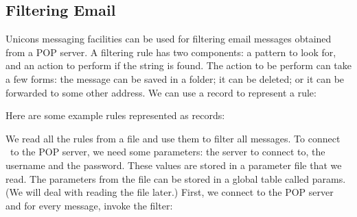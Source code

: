 \subsection{Filtering Email}

Unicon{\textquotesingle}s messaging facilities can be used for filtering
email messages obtained from a POP server. A filtering rule has two
components: a pattern to look for, and an action to perform if the
string is found. The action to be perform can take a few forms: the
message can be saved in a folder; it can be deleted; or it can be
forwarded to some other address. We can use a record to represent a
rule:


Here are some example rules represented as records:



\bigskip

We read all the rules from a file and use them to filter all messages.
To connect \ to the POP server, we need some parameters: the server to
connect to, the username and the password. These values are stored in a
parameter file that we read. The parameters from the file can be stored
in a global table called \textsf{params}. (We will deal with reading
the file later.) First, we connect to the POP server and for every
message, invoke the filter:

